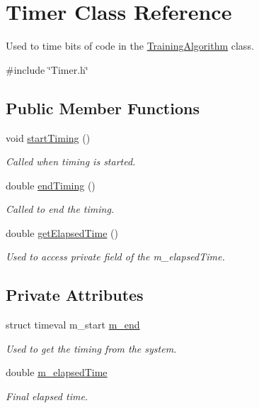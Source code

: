\hypertarget{classTimer}{}\section{Timer Class Reference}
\label{classTimer}


Used to time bits of code in the \hyperlink{classTrainingAlgorithm}{Training\+Algorithm} class.  




{\ttfamily \#include \char`\"{}Timer.\+h\char`\"{}}

\subsection*{Public Member Functions}
\begin{DoxyCompactItemize}
\item 
void \hyperlink{classTimer_afea3900d493fb20a135cd57007d8cf9c}{start\+Timing} ()
\begin{DoxyCompactList}\small\item\em Called when timing is started. \end{DoxyCompactList}\item 
double \hyperlink{classTimer_a45f3ff9aa3a4b1fe814bc02355fc1377}{end\+Timing} ()
\begin{DoxyCompactList}\small\item\em Called to end the timing. \end{DoxyCompactList}\item 
double \hyperlink{classTimer_a71aa716bd43676a5a340eeca5f41cece}{get\+Elapsed\+Time} ()
\begin{DoxyCompactList}\small\item\em Used to access private field of the m\+\_\+elapsed\+Time. \end{DoxyCompactList}\end{DoxyCompactItemize}
\subsection*{Private Attributes}
\begin{DoxyCompactItemize}
\item 
struct timeval m\+\_\+start \hyperlink{classTimer_a68f37c9bd07027d23798fd80deb37c25}{m\+\_\+end}
\begin{DoxyCompactList}\small\item\em Used to get the timing from the system. \end{DoxyCompactList}\item 
double \hyperlink{classTimer_ab8501c3b3cf597a2040f3508baad1306}{m\+\_\+elapsed\+Time}
\begin{DoxyCompactList}\small\item\em Final elapsed time. \end{DoxyCompactList}\end{DoxyCompactItemize}


